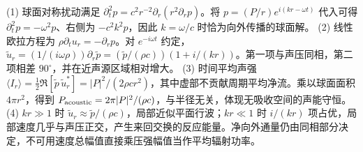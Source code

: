 (1) 球面对称扰动满足 \(\partial_t^2p=c^2r^{-2}\partial_r(r^2\partial_rp)\)。将 \(p=(P/r)e^{i(kr-\omega t)}\) 代入可得 \(\partial_t^2p=-\omega^2p\)、右侧为 \(-c^2k^2p\)，因此 \(k=\omega/c\) 时恰为向外传播的球面解。
(2) 线性欧拉方程为 \(\rho\partial_tu_r=-\partial_rp\)。对 \(e^{-i\omega t}\) 约定，\(\tilde u_r=(1/(i\omega\rho))\partial_r\tilde p=(\tilde p/(\rho c))(1+i/(kr))\)。第一项与声压同相，第二项相差 \(90^\circ\)，并在近声源区域相对增大。
(3) 时间平均声强 \(\langle I_r\rangle=\frac12\Re[\tilde p\,\tilde u_r^*]=|P|^2/(2\rho c r^2)\)，其中虚部不贡献周期平均净流。乘以球面面积 \(4\pi r^2\)，得到 \(P_{\rm acoustic}=2\pi |P|^2/(\rho c)\)，与半径无关，体现无吸收空间的声能守恒。
(4) \(kr\gg1\) 时 \(\tilde u_r\approx\tilde p/(\rho c)\)，局部近似平面行波；\(kr\ll1\) 时 \(i/(kr)\) 项占优，局部速度几乎与声压正交，产生来回交换的反应能量。净向外通量仍由同相部分决定，不可用速度总幅值直接乘压强幅值当作平均辐射功率。
